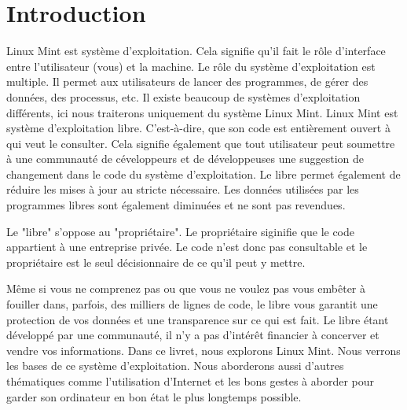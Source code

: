 \documentclass[12pt]{book}
\begin{document}
\newpage
\tableofcontents

\chapter{Introduction}
Linux Mint est système d'exploitation.
Cela signifie qu'il fait le rôle d'interface entre l'utilisateur (vous) et la machine.
Le rôle du système d'exploitation est multiple.
Il permet aux utilisateurs de lancer des programmes, de gérer des données, des processus, etc.
Il existe beaucoup de systèmes d'exploitation différents, ici nous traiterons uniquement du système Linux Mint.
Linux Mint est système d'exploitation libre.
C'est-à-dire, que son code est entièrement ouvert à qui veut le consulter.
Cela signifie également que tout utilisateur peut soumettre à une communauté de céveloppeurs et de développeuses une suggestion de changement dans le code du système d'exploitation.
Le libre permet également de réduire les mises à jour au stricte nécessaire.
Les données utilisées par les programmes libres sont également diminuées et ne sont pas revendues.\par
Le "libre" s'oppose au "propriétaire".
Le propriétaire siginifie que le code appartient à une entreprise privée.
Le code n'est donc pas consultable et le propriétaire est le seul décisionnaire de ce qu'il peut y mettre.\par
Même si vous ne comprenez pas ou que vous ne voulez pas vous embêter à fouiller dans, parfois, des milliers de lignes de code, le libre vous garantit une protection de vos données et une transparence sur ce qui est fait.
Le libre étant développé par une communauté, il n'y a pas d'intérêt financier à concerver et vendre vos informations.
Dans ce livret, nous explorons Linux Mint.
Nous verrons les bases de ce système d'exploitation.
Nous aborderons aussi d'autres thématiques comme l'utilisation d'Internet et les bons gestes à aborder pour garder son ordinateur en bon état le plus longtemps possible.
\end{document}
